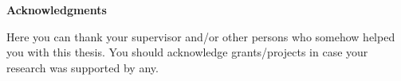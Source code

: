 
\newpage
\pagestyle{plain}

\null
\vfill
{\noindent\bf Acknowledgments}

Here you can thank your supervisor and/or other persons who somehow helped you with this thesis.
You should acknowledge grants/projects in case your research was supported by any.
